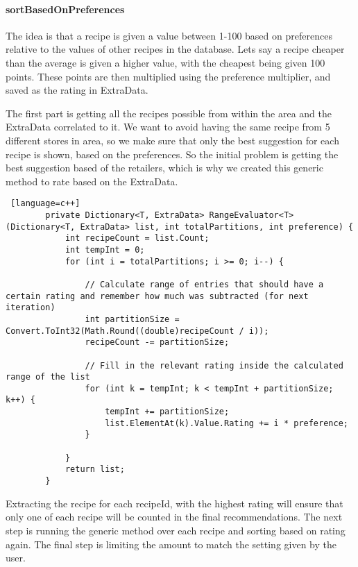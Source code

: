 \paragraph{sortBasedOnPreferences}

The idea is that a recipe is given a value between 1-100 based on preferences relative to the values of other recipes in the database. Lets say a recipe cheaper than the average is given a higher value, with the cheapest being given 100 points. These points are then multiplied using the preference multiplier, and saved as the rating in ExtraData.

The first part is getting all the recipes possible from within the area and the ExtraData correlated to it. We want to avoid having the same recipe from 5 different stores in area, so we make sure that only the best suggestion for each recipe is shown, based on the preferences. So the initial problem is getting the best suggestion based of the retailers, which is why we created this generic method to rate based on the ExtraData.

\begin{lstlisting} [language=c++]
        private Dictionary<T, ExtraData> RangeEvaluator<T>(Dictionary<T, ExtraData> list, int totalPartitions, int preference) {
            int recipeCount = list.Count;
            int tempInt = 0;
            for (int i = totalPartitions; i >= 0; i--) {

                // Calculate range of entries that should have a certain rating and remember how much was subtracted (for next iteration)
                int partitionSize = Convert.ToInt32(Math.Round((double)recipeCount / i));
                recipeCount -= partitionSize;

                // Fill in the relevant rating inside the calculated range of the list
                for (int k = tempInt; k < tempInt + partitionSize; k++) {
                    tempInt += partitionSize;
                    list.ElementAt(k).Value.Rating += i * preference;
                }

            }
            return list;
        }
\end{lstlisting}

Extracting the recipe for each recipeId, with the highest rating will ensure that only one of each recipe will be counted in the final recommendations. The next step is running the generic method over each recipe and sorting based on rating again. The final step is limiting the amount to match the setting given by the user.